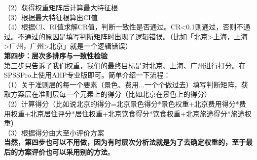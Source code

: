 \documentclass[11pt,a4paper]{article}
\begin{document}
（2）获得权重矩阵后计算最大特征根\\
（3）根据最大特征根算出CI值\\
（4）根据CI、RI值求解CR值，判断一致性是否通过。CR<0.1则通过，否则不通过。不通过的原因是填写判断矩阵时出现了逻辑错误。（比如「北京>上海，上海>广州，广州>北京」就是一个逻辑错误）\\
\textbf{第四步：\textbf{层次多排序与一致性检验}}\\
\indent\setlength{\parindent}{2em}第三步只告诉了我们权重，我们的最终目标是对北京、上海、广州进行打分。在SPSSPro上使用AHP专业版即可。简单介绍一下流程：\\
（1）关于准则层的每一个要素（景色、费用...一个个做过去）填写判断矩阵，获取方案层在准则层每一个元素上的得分（比如北京在景色上的得分）\\
（2）计算得分（比如说北京的得分=北京景色得分*景色权重+北京费用得分*费用权重+北京居住评分*居住权重+北京饮食得分*饮食权重+北京旅途得分*旅途权重）\\
（3）根据得分由大至小评价方案\\
\indent\setlength{\parindent}{2em}\textbf{当然，第四步也可以不用做，因为有时层次分析法就是为了去确定权重的，至于最后的方案评价也可以采用别的方法}。
\end{document}
